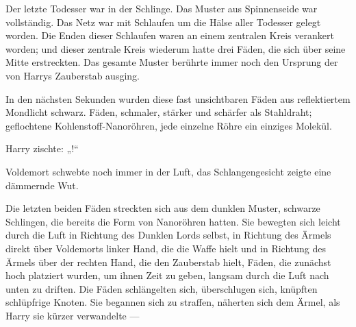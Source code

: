 Der letzte Todesser war in der Schlinge. Das Muster aus Spinnenseide war vollständig. Das Netz war mit Schlaufen um die Hälse aller Todesser gelegt worden. Die Enden dieser Schlaufen waren an einem zentralen Kreis verankert worden; und dieser zentrale Kreis wiederum hatte drei Fäden, die sich über seine Mitte erstreckten. Das gesamte Muster berührte immer noch den Ursprung der von Harrys Zauberstab ausging.

In den nächsten Sekunden wurden diese fast unsichtbaren Fäden aus reflektiertem Mondlicht schwarz.
Fäden, schmaler, stärker und schärfer als Stahldraht; geflochtene Kohlenstoff-Nanoröhren, jede einzelne Röhre ein einziges Molekül.

Harry zischte: „!“

Voldemort schwebte noch immer in der Luft, das Schlangengesicht zeigte eine dämmernde Wut.

Die letzten beiden Fäden streckten sich aus dem dunklen Muster, schwarze Schlingen, die bereits die Form von Nanoröhren hatten. Sie bewegten sich leicht durch die Luft in Richtung des Dunklen Lords selbst, in Richtung des Ärmels direkt über Voldemorts linker Hand, die die Waffe hielt und in Richtung des Ärmels über der rechten Hand, die den Zauberstab hielt, Fäden, die zunächst hoch platziert wurden, um ihnen Zeit zu geben, langsam durch die Luft nach unten zu driften. Die Fäden schlängelten sich, überschlugen sich, knüpften schlüpfrige Knoten. Sie begannen sich zu straffen, näherten sich dem Ärmel, als Harry sie kürzer verwandelte —

